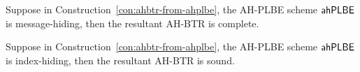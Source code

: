 \begin{theorem}\label{thm:ahbtr-from-ahplbe-completeness}
Suppose in Construction~\ref{con:ahbtr-from-ahplbe},
the AH-PLBE scheme $\AHPLBE$ is message-hiding,
then the resultant AH-BTR is complete.
\end{theorem}

\begin{theorem}\label{thm:ahbtr-from-ahplbe-soundness}
Suppose in Construction~\ref{con:ahbtr-from-ahplbe},
the AH-PLBE scheme $\AHPLBE$ is index-hiding,
then the resultant AH-BTR is sound.
\end{theorem}
